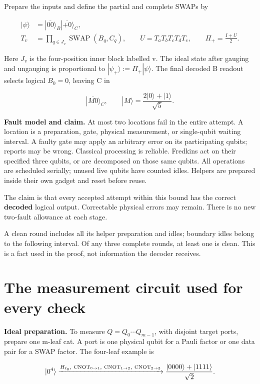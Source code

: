\documentclass[11pt]{article}
\begin{document}
Prepare the inputs and define the partial and complete SWAPs by

\[
\begin{aligned}
|\psi\rangle&=|\overline{00}\rangle_B|\overline{+0}\rangle_C,\\
T_v&=\prod_{q\in J_v}\operatorname{SWAP}(B_q,C_q),\qquad
U=T_aT_bT_cT_dT_e,\qquad \Pi_+=\frac{I+U}{2}.
\end{aligned}
\]

Here \(J_v\) is the four-position inner block labelled v. The ideal state after gauging and ungauging is proportional to \(|\psi_+\rangle:=\Pi_+|\psi\rangle\). The final decoded B readout selects logical \(B_0=0\), leaving C in

\[
|\overline{M0}\rangle_C,\qquad |M\rangle=\frac{2|0\rangle+|1\rangle}{\sqrt5}.
\]

\textbf{Fault model and claim.} At most two locations fail in the entire attempt. A location is a preparation, gate, physical measurement, or single-qubit waiting interval. A faulty gate may apply an arbitrary error on its participating qubits; reports may be wrong. Classical processing is reliable. Fredkins act on their specified three qubits, or are decomposed on those same qubits. All operations are scheduled serially; unused live qubits have counted idles. Helpers are prepared inside their own gadget and reset before reuse.

The claim is that every accepted attempt within this bound has the correct \textbf{decoded} logical output. Correctable physical errors may remain. There is no new two-fault allowance at each stage.

A clean round includes all its helper preparation and idles; boundary idles belong to the following interval. Of any three complete rounds, at least one is clean. This is a fact used in the proof, not information the decoder receives.

\section{The measurement circuit used for every check}
\textbf{Ideal preparation.} To measure \(Q=Q_0\cdots Q_{m-1}\), with disjoint target ports, prepare one m-leaf cat. A port is one physical qubit for a Pauli factor or one data pair for a SWAP factor. The four-leaf example is

\[
|0^4\rangle\xrightarrow{H_{\ell_0},\ {\rm CNOT}_{0\to1},\ {\rm CNOT}_{1\to2},\ {\rm CNOT}_{2\to3}}
\frac{|0000\rangle+|1111\rangle}{\sqrt2}.
\]
\end{document}
